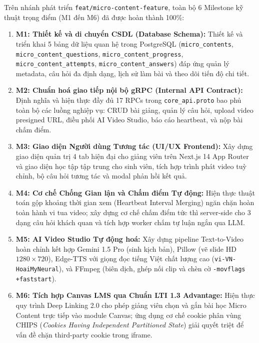Trên nhánh phát triển \texttt{feat/micro-content-feature}, toàn bộ 6
Milestone kỹ thuật trọng điểm (M1 đến M6) đã được hoàn thành 100\%:
\begin{enumerate}
    \item \textbf{M1: Thiết kế và di chuyển CSDL (Database Schema):} Thiết kế
          và triển khai 5 bảng dữ liệu quan hệ trong PostgreSQL (\texttt{micro\_contents},
          \texttt{micro\_content\_questions}, \texttt{micro\_content\_progress},
          \texttt{micro\_content\_attempts}, \texttt{micro\_content\_answers})
          đáp ứng quản lý metadata, câu hỏi đa định dạng, lịch sử làm bài và
          theo dõi tiến độ chi tiết.
    \item \textbf{M2: Chuẩn hoá giao tiếp nội bộ gRPC (Internal API Contract):}
          Định nghĩa và hiện thực đầy đủ 17 RPCs trong \texttt{core\_api.proto}
          bao phủ toàn bộ các luồng nghiệp vụ: CRUD bài giảng, quản lý câu hỏi,
          upload video presigned URL, điều phối AI Video Studio, báo cáo
          heartbeat, và nộp bài chấm điểm.
    \item \textbf{M3: Giao diện Người dùng Tương tác (UI/UX Frontend):} Xây
          dựng giao diện quản trị 4 tab hiện đại cho giảng viên trên Next.js 14
          App Router và giao diện học tập tập trung cho sinh viên, tích hợp
          trình phát video tuỳ chỉnh, bộ câu hỏi tương tác và modal phản hồi
          kết quả.
    \item \textbf{M4: Cơ chế Chống Gian lận và Chấm điểm Tự động:} Hiện thực
          thuật toán gộp khoảng thời gian xem (Heartbeat Interval Merging)
          ngăn chặn hoàn toàn hành vi tua video; xây dựng cơ chế chấm điểm tức
          thì server-side cho 3 dạng câu hỏi khách quan và tích hợp worker
          chấm tự luận ngắn qua LLM.
    \item \textbf{M5: AI Video Studio Tự động hoá:} Xây dựng pipeline
          Text-to-Video hoàn chỉnh kết hợp Gemini 1.5 Pro (sinh kịch bản),
          Pillow (vẽ slide HD $1280 \times 720$), Edge-TTS với giọng đọc tiếng Việt
          chất lượng cao (\texttt{vi-VN-HoaiMyNeural}), và FFmpeg (biên dịch,
          ghép nối clip và chèn cờ \texttt{-movflags +faststart}).
    \item \textbf{M6: Tích hợp Canvas LMS qua Chuẩn LTI 1.3 Advantage:} Hiện
          thực quy trình Deep Linking 2.0 cho phép giảng viên chọn và gắn bài
          học Micro Content trực tiếp vào module Canvas; ứng dụng cơ chế cookie
          phân vùng CHIPS (\textit{Cookies Having Independent Partitioned State})
          giải quyết triệt để vấn đề chặn third-party cookie trong iframe.
\end{enumerate}

